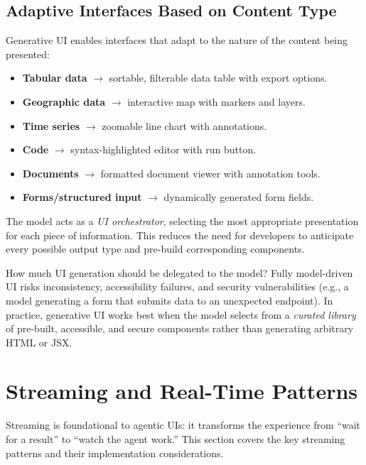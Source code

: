 \subsection{Adaptive Interfaces Based on Content Type}
\label{adaptive-interfaces-based-on-content-type}

Generative UI enables interfaces that adapt to the nature of the content being presented:

\begin{itemize}
  \item \textbf{Tabular data} $\rightarrow$ sortable, filterable data table with export options.
  \item \textbf{Geographic data} $\rightarrow$ interactive map with markers and layers.
  \item \textbf{Time series} $\rightarrow$ zoomable line chart with annotations.
  \item \textbf{Code} $\rightarrow$ syntax-highlighted editor with run button.
  \item \textbf{Documents} $\rightarrow$ formatted document viewer with annotation tools.
  \item \textbf{Forms/structured input} $\rightarrow$ dynamically generated form fields.
\end{itemize}

The model acts as a \emph{UI orchestrator}, selecting the most appropriate presentation for each piece of information. This reduces the need for developers to anticipate every possible output type and pre-build corresponding components.

\begin{questionbox}
How much UI generation should be delegated to the model? Fully model-driven UI risks inconsistency, accessibility failures, and security vulnerabilities (e.g., a model generating a form that submits data to an unexpected endpoint). In practice, generative UI works best when the model selects from a \emph{curated library} of pre-built, accessible, and secure components rather than generating arbitrary HTML or JSX.
\end{questionbox}

\section{Streaming and Real-Time Patterns}
\label{subsec:streaming-patterns}

Streaming is foundational to agentic UIs: it transforms the experience from ``wait for a result'' to ``watch the agent work.'' This section covers the key streaming patterns and their implementation considerations.


